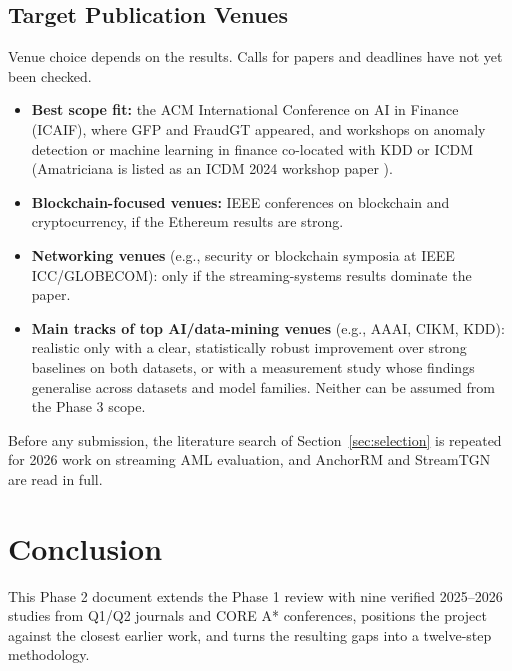 \documentclass[11pt,a4paper]{article}
\begin{document}
\subsection{Target Publication Venues}
Venue choice depends on the results. Calls for papers and deadlines have not yet been checked.
\begin{itemize}[leftmargin=*]
    \item \textbf{Best scope fit:} the ACM International Conference on AI in Finance (ICAIF), where GFP \cite{blanusa2024gfp} and FraudGT \cite{lin2024fraudgt} appeared, and workshops on anomaly detection or machine learning in finance co-located with KDD or ICDM (Amatriciana is listed as an ICDM 2024 workshop paper \cite{digennaro2025amatriciana}).
    \item \textbf{Blockchain-focused venues:} IEEE conferences on blockchain and cryptocurrency, if the Ethereum results are strong.
    \item \textbf{Networking venues} (e.g., security or blockchain symposia at IEEE ICC/GLOBECOM): only if the streaming-systems results dominate the paper.
    \item \textbf{Main tracks of top AI/data-mining venues} (e.g., AAAI, CIKM, KDD): realistic only with a clear, statistically robust improvement over strong baselines on both datasets, or with a measurement study whose findings generalise across datasets and model families. Neither can be assumed from the Phase 3 scope.
\end{itemize}
Before any submission, the literature search of Section~\ref{sec:selection} is repeated for 2026 work on streaming AML evaluation, and AnchorRM and StreamTGN are read in full.

\section{Conclusion}
\label{sec:conclusion}

This Phase 2 document extends the Phase 1 review with nine verified 2025--2026 studies from Q1/Q2 journals and CORE A* conferences, positions the project against the closest earlier work, and turns the resulting gaps into a twelve-step methodology.
\end{document}
